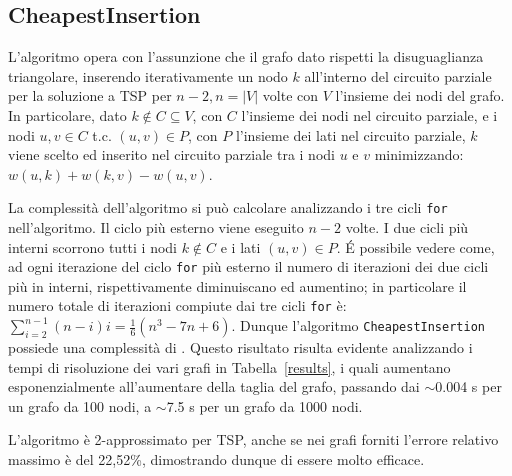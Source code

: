 \subsection{CheapestInsertion}

L'algoritmo opera con l'assunzione che il grafo dato rispetti la disuguaglianza triangolare, inserendo iterativamente un nodo $k$ all'interno del circuito parziale per la soluzione a TSP per $n-2, n=|V|$ volte con $V$ l'insieme dei nodi del grafo. In particolare, dato $k \notin C \subseteq V$, con $C$ l'insieme dei nodi nel circuito parziale, e i nodi $u,v \in C$ \mbox{t.c.} $(u,v)\in P$, con $P$ l'insieme dei lati nel circuito parziale, $k$ viene scelto ed inserito nel circuito parziale tra i nodi $u$ e $v$ minimizzando: $w(u,k)+w(k,v)-w(u,v)$.\acapo

La complessità dell'algoritmo si può calcolare analizzando i tre cicli \texttt{for} nell'algoritmo. Il ciclo più esterno viene eseguito $n-2$ volte. I due cicli più interni scorrono tutti i nodi $k \notin C$ e i lati $(u,v)\in P$. \'E possibile vedere come, ad ogni iterazione del ciclo \texttt{for} più esterno il numero di iterazioni dei due cicli più in interni, rispettivamente diminuiscano ed aumentino; in particolare il numero totale di iterazioni compiute dai tre cicli \texttt{for} è: $\sum_{i=2}^{n-1} (n-i)i=\frac{1}{6}(n^3-7n+6)$. Dunque l'algoritmo \texttt{CheapestInsertion} possiede una complessità di .
Questo risultato risulta evidente analizzando i tempi di risoluzione dei vari grafi in Tabella~\ref{results}, i quali aumentano esponenzialmente all'aumentare della taglia del grafo, passando dai $\sim$0.004 s per un grafo da 100 nodi, a $\sim$7.5 s per un grafo da 1000 nodi.\acapo

L'algoritmo è 2-approssimato per TSP, anche se nei grafi forniti l'errore relativo massimo è del 22,52\%, dimostrando dunque di essere molto efficace.

